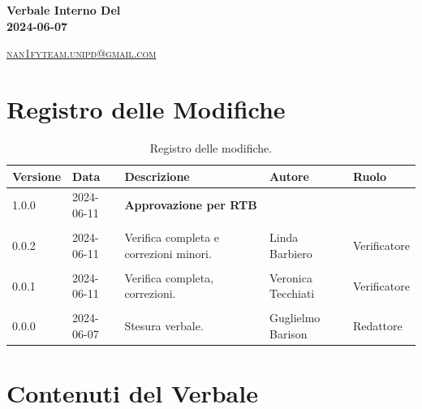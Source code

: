 \documentclass[8pt]{article}
\begin{document}
\begin{titlepage}
\begin{minipage}[t]{0.47\textwidth}
{		}
		\vspace{4mm}\vspace{4mm}
	\end{minipage}
	\vspace{4cm}
	\begin{center}
		\begin{flushright}
			{\fontsize{30pt}{52pt}\selectfont \textbf{Verbale Interno Del\\2024-06-07\\}} %
		\end{flushright}
		\vspace{3cm}
	\end{center}
	\vspace{8.5 cm}
	{\small \textsc{\href{mailto: nan1fyteam.unipd@gmail.com}{nan1fyteam.unipd@gmail.com}}}
\end{titlepage}
\pagestyle{mystyle}
\section*{Registro delle Modifiche}
\begin{table}[ht!]	
	\centering
	\begin{tabular}{p{1.2cm} p{2cm} p{6cm} p{3cm} p{2cm}}
		\toprule
		\textbf{Versione}& \textbf{Data} & \textbf{Descrizione} & \textbf{Autore} & \textbf{Ruolo} \\
		\midrule
			1.0.0 & 2024-06-11 & \textbf{Approvazione per RTB} & & \\\\
			0.0.2 & 2024-06-11 & Verifica completa e correzioni minori. & Linda Barbiero & Verificatore \\\\
            0.0.1 & 2024-06-11 & Verifica completa, correzioni. & Veronica Tecchiati & Verificatore \\\\
			0.0.0 & 2024-06-07 & Stesura verbale. & Guglielmo Barison & Redattore
 			\\ %

		\bottomrule
	\end{tabular}
	\caption{Registro delle modifiche.}
	\label{table:Registro delle modifiche}
\end{table}
\newpage
\tableofcontents
\clearpage
\newpage
\justifying
\section{Contenuti del Verbale}
\end{document}
